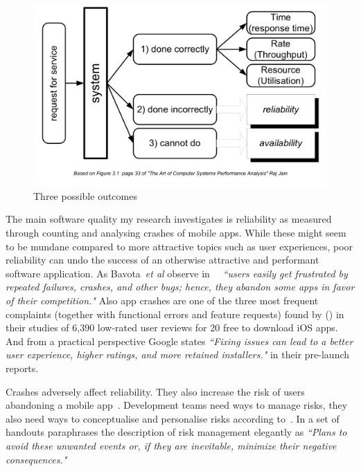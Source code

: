\begin{figure}
    \centering
    \includegraphics[width=\linewidth]{images/commercetest/raj-jain-performance-reliability-availability.png}
    \caption{Three possible outcomes}
    \label{fig:three-possible-ourcomes}
\end{figure}
\afterpage{\clearpage}

The main software quality my research investigates is reliability as measured through counting and analysing crashes of mobile apps. While these might seem to be mundane compared to more attractive topics such as user experiences, poor reliability can undo the success of an otherwise attractive and performant software application. As Bavota~\emph{et al} observe in~ ~\emph{``users easily get frustrated by repeated failures, crashes, and other bugs; hence, they abandon some apps in favor of their competition."} Also app crashes are one of the three most frequent complaints (together with functional errors and feature requests) found by () in their studies of 6,390 low-rated user reviews for 20 free to download iOS apps. And from a practical perspective Google states \emph{``Fixing issues can lead to a better user experience, higher ratings, and more retained installers."} in their pre-launch reports.


Crashes adversely affect reliability. They also increase the risk of users abandoning a mobile app~. Development teams need ways to manage risks, they also need ways to conceptualise and personalise risks according to~\textcite{pfleeger2000_risky_business}. In a set of handouts paraphrases the description of risk management elegantly as \textit{``Plans to avoid these unwanted events or, if they are inevitable, minimize their negative consequences."}~%


